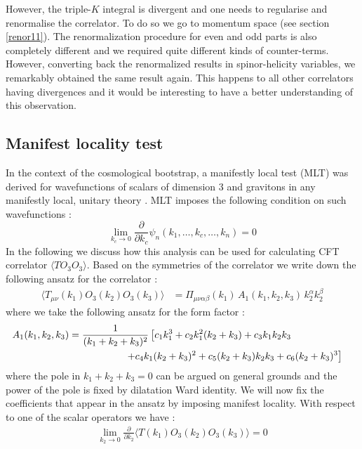 \documentclass[a4paper,11pt]{article}
\begin{document}
However, the triple-$K$ integral is divergent and one needs to regularise and renormalise the correlator.
To  do so  we go to momentum space (see section \ref{renor11}). The renormalization procedure for even and odd parts is also completely different and we required quite different kinds of counter-terms. However, converting back the renormalized  results in spinor-helicity variables, we remarkably obtained the same result again. This happens to all other correlators having divergences and it would be interesting to have a better understanding of this observation. 

\subsection{Manifest locality test}\label{MLT}
%
In the context of the cosmological bootstrap, a manifestly local test (MLT) was derived for wavefunctions of scalars of dimension 3 and gravitons in any manifestly local, unitary theory \cite{Jazayeri:2021fvk}. MLT imposes the following condition on such wavefunctions \cite{Jazayeri:2021fvk} :
%
\begin{equation}
\lim_{k_c\rightarrow 0}\frac{\partial}{\partial k_c}\psi_{n}(k_1,\ldots, k_c,\ldots, k_n)=0
\end{equation}
%
In the following we discuss how this analysis can be used for calculating CFT correlator $\langle TO_3O_3\rangle.$
Based on the symmetries of the correlator we write down the following ansatz for the correlator :
\begin{align}
\langle T_{\mu\nu}(k_1)O_3(k_2)O_3(k_3)\rangle&=\Pi_{\mu\nu\alpha\beta}(k_1)\,A_1(k_1,k_2,k_3)\,k_{2}^{\alpha}k_{2}^{\beta}
\end{align}
where we take the following ansatz for the form factor :
\begin{align}
A_1(k_1,k_2,k_3)&=\frac{1}{(k_1+k_2+k_3)^2}\left[c_1k_1^3+c_2k_1^2(k_2+k_3)+c_3k_1k_2k_3\right.\cr
&\hspace{2cm}\left.+c_4k_1(k_2+k_3)^2+c_5(k_2+k_3)k_2k_3+c_6(k_2+k_3)^3\right]
\end{align}
where the pole in $k_1+k_2+k_3=0$ can be argued on general grounds and the power of the pole is fixed by dilatation Ward identity.
We will now fix the coefficients that appear in the ansatz by imposing manifest locality. With respect to one of the scalar operators we have :
%
\begin{align}
\lim_{k_2\rightarrow 0}\frac{\partial}{\partial k_2}\langle T(k_1)O_3(k_2)O_3(k_3)\rangle=0
\end{align}
\end{document}
